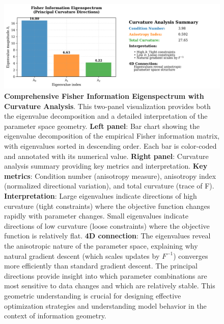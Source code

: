 \documentclass[
  10pt,
]{article}
\begin{document}
\begin{figure}
\centering
\includegraphics{../output/figures/fisher_information_eigenspectrum.png}
\caption{\textbf{Comprehensive Fisher Information Eigenspectrum with
Curvature Analysis}. This two-panel visualization provides both the
eigenvalue decomposition and a detailed interpretation of the parameter
space geometry. \textbf{Left panel}: Bar chart showing the eigenvalue
decomposition of the empirical Fisher information matrix, with
eigenvalues sorted in descending order. Each bar is color-coded and
annotated with its numerical value. \textbf{Right panel}: Curvature
analysis summary providing key metrics and interpretation. \textbf{Key
metrics}: Condition number (anisotropy measure), anisotropy index
(normalized directional variation), and total curvature (trace of F).
\textbf{Interpretation}: Large eigenvalues indicate directions of high
curvature (tight constraints) where the objective function changes
rapidly with parameter changes. Small eigenvalues indicate directions of
low curvature (loose constraints) where the objective function is
relatively flat. \textbf{4D connection}: The eigenvalues reveal the
anisotropic nature of the parameter space, explaining why natural
gradient descent (which scales updates by \(F^{-1}\)) converges more
efficiently than standard gradient descent. The principal directions
provide insight into which parameter combinations are most sensitive to
data changes and which are relatively stable. This geometric
understanding is crucial for designing effective optimization strategies
and understanding model behavior in the context of information
geometry.}
\end{figure}
\end{document}
